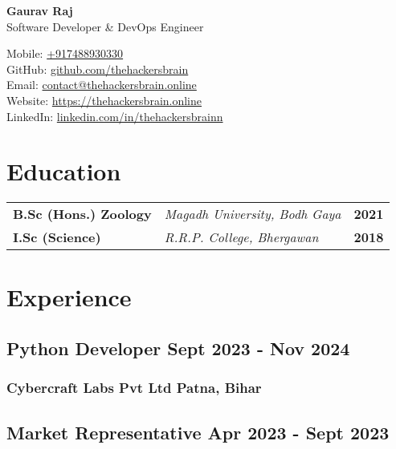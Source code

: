 \documentclass[11pt]{article}
\begin{document}
\begin{center}
	\begin{minipage}{0.4\textwidth}
		{\Huge\bfseries
			Gaurav Raj %
		} \\ \medskip
		Software Developer \& DevOps Engineer %
	\end{minipage} \hfill
	\begin{minipage}{0.5\textwidth}
		\raggedleft
		Mobile: \href{tel:+917488930330}{+917488930330} \\
		GitHub: \href{https://github.com/thehackersbrain}{github.com/thehackersbrain} \\
		Email: \href{mailto:contact@thehackersbrain.online}{contact@thehackersbrain.online} \\
		Website: \href{https://thehackersbrain.online}{https://thehackersbrain.online} \\
		LinkedIn: \href{https://www.linkedin.com/in/thehackersbrainn}{linkedin.com/in/thehackersbrainn}
	\end{minipage}
\end{center}

\section{Education}

\begin{tabular}{@{} p{} p{} r @{}}
    \textbf{B.Sc (Hons.) Zoology} & \textit{Magadh University, Bodh Gaya} & \textbf{2021} \\
    \textbf{I.Sc (Science)} & \textit{R.R.P. College, Bhergawan} & \textbf{2018} \\
\end{tabular}

\section{Experience}
\subsection{Python Developer \hfill Sept 2023 - Nov 2024}
\subsubsection{Cybercraft Labs Pvt Ltd \hfill Patna, Bihar}
\vspace{8pt}
\subsection{Market Representative \hfill Apr 2023 - Sept 2023}
\end{document}
